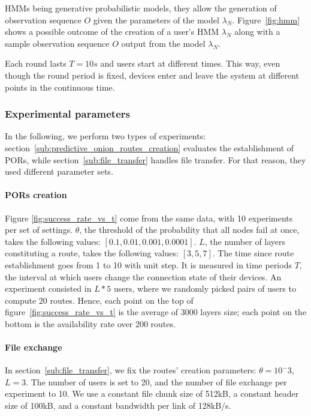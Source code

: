 HMMs being generative probabilistic models, they allow the generation of observation sequence $O$ given the parameters of the model $\lambda_N$.
Figure~\ref{fig:hmm} shows a possible outcome of the creation of a user's HMM $\lambda_N$ along with a sample observation sequence $O$ output from the model $\lambda_N$.

Each round lasts $T=10s$ and users start at different times. 
This way, even though the round period is fixed, devices enter and leave the system at different points in the continuous time.


\subsubsection{Experimental parameters} %
\label{ssub:experimental_parameters}

In the following, we perform two types of experiments: 
section~\ref{sub:predictive_onion_routes_creation} evaluates the establishment of PORs, while section~\ref{sub:file_transfer} handles file transfer.
For that reason, they used different parameter sets.


\paragraph*{PORs creation}
Figure \ref{fig:success_rate_vs_t} come from the same data, with 10 experiments per set of settings.
$\theta$, the threshold of the probability that all nodes fail at once, takes the following values: $[0.1, 0.01, 0.001, 0.0001]$.
$L$, the number of layers constituting a route, takes the following values: $[3, 5, 7]$.
The time since route establishment goes from 1 to 10 with  unit step.
It is measured in time periods $T$, the interval at which users change the connection state of their devices.
An experiment consisted in $L*5$ users, where we randomly picked pairs of users to compute 20 routes.
Hence, each point on the top of figure~\ref{fig:success_rate_vs_t} is the average of 3000 layers size; 
each point on the bottom is the availability rate over 200 routes.


\paragraph*{File exchange}
In section~\ref{sub:file_transfer}, we fix the routes' creation parameters: $\theta=10^-3$, $L=3$.
The number of users is set to 20, and the number of file exchange per experiment to 10.
We use a constant file chunk size of 512kB, a constant header size of 100kB, and a constant bandwidth per link of 128kB/s.

